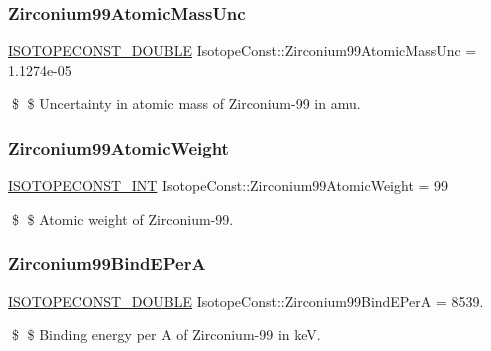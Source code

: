 \subsubsection{\texorpdfstring{Zirconium99\+Atomic\+Mass\+Unc}{Zirconium99AtomicMassUnc}}
{\footnotesize\ttfamily \mbox{\hyperlink{group___isotope_const-_macros_ga8f45a7272ce02c0b4c65c44636ed719a}{I\+S\+O\+T\+O\+P\+E\+C\+O\+N\+S\+T\+\_\+\+D\+O\+U\+B\+LE}} Isotope\+Const\+::\+Zirconium99\+Atomic\+Mass\+Unc = 1.\+1274e-\/05}

\$ \$ Uncertainty in atomic mass of Zirconium-\/99 in amu. \mbox{\label{group___isotope_const-_zirconium-_zr99_gae742f9349013275b2c248203f0b865ae}} 
\subsubsection{\texorpdfstring{Zirconium99\+Atomic\+Weight}{Zirconium99AtomicWeight}}
{\footnotesize\ttfamily \mbox{\hyperlink{group___isotope_const-_macros_ga5f18360b3e99483a35c32d789e62621c}{I\+S\+O\+T\+O\+P\+E\+C\+O\+N\+S\+T\+\_\+\+I\+NT}} Isotope\+Const\+::\+Zirconium99\+Atomic\+Weight = 99}

\$ \$ Atomic weight of Zirconium-\/99. \mbox{\label{group___isotope_const-_zirconium-_zr99_gaad0a9555aa911f117801bf3678c89cbb}} 
\subsubsection{\texorpdfstring{Zirconium99\+Bind\+E\+PerA}{Zirconium99BindEPerA}}
{\footnotesize\ttfamily \mbox{\hyperlink{group___isotope_const-_macros_ga8f45a7272ce02c0b4c65c44636ed719a}{I\+S\+O\+T\+O\+P\+E\+C\+O\+N\+S\+T\+\_\+\+D\+O\+U\+B\+LE}} Isotope\+Const\+::\+Zirconium99\+Bind\+E\+PerA = 8539.}

\$ \$ Binding energy per A of Zirconium-\/99 in keV. \mbox{\label{group___isotope_const-_zirconium-_zr99_ga29c1da8811976dbae7062800fc19556a}} 
